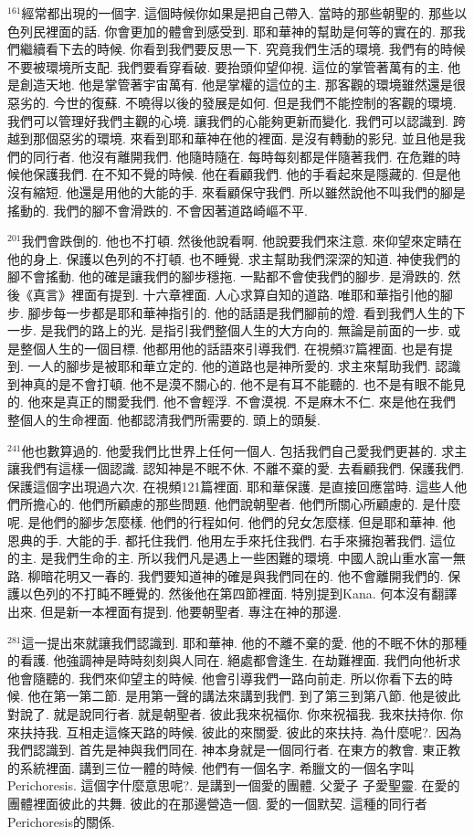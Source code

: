 \documentclass{book}
\begin{document}
$^{161}$經常都出現的一個字.
這個時候你如果是把自己帶入.
當時的那些朝聖的.
那些以色列民裡面的話.
你會更加的體會到感受到.
耶和華神的幫助是何等的實在的.
那我們繼續看下去的時候.
你看到我們要反思一下.
究竟我們生活的環境.
我們有的時候不要被環境所支配.
我們要看穿看破.
要抬頭仰望仰視.
這位的掌管著萬有的主.
他是創造天地.
他是掌管著宇宙萬有.
他是掌權的這位的主.
那客觀的環境雖然還是很惡劣的.
今世的復蘇.
不曉得以後的發展是如何.
但是我們不能控制的客觀的環境.
我們可以管理好我們主觀的心境.
讓我們的心能夠更新而變化.
我們可以認識到.
跨越到那個惡劣的環境.
來看到耶和華神在他的裡面.
是沒有轉動的影兒.
並且他是我們的同行者.
他沒有離開我們.
他隨時隨在.
每時每刻都是伴隨著我們.
在危難的時候他保護我們.
在不知不覺的時候.
他在看顧我們.
他的手看起來是隱藏的.
但是他沒有縮短.
他還是用他的大能的手.
來看顧保守我們.
所以雖然說他不叫我們的腳是搖動的.
我們的腳不會滑跌的.
不會因著道路崎嶇不平.

$^{201}$我們會跌倒的.
他也不打頓.
然後他說看啊.
他說要我們來注意.
來仰望來定睛在他的身上.
保護以色列的不打頓.
也不睡覺.
求主幫助我們深深的知道.
神使我們的腳不會搖動.
他的確是讓我們的腳步穩拖.
一點都不會使我們的腳步.
是滑跌的.
然後《真言》裡面有提到.
十六章裡面.
人心求算自知的道路.
唯耶和華指引他的腳步.
腳步每一步都是耶和華神指引的.
他的話語是我們腳前的燈.
看到我們人生的下一步.
是我們的路上的光.
是指引我們整個人生的大方向的.
無論是前面的一步.
或是整個人生的一個目標.
他都用他的話語來引導我們.
在視頻37篇裡面.
也是有提到.
一人的腳步是被耶和華立定的.
他的道路也是神所愛的.
求主來幫助我們.
認識到神真的是不會打頓.
他不是漠不關心的.
他不是有耳不能聽的.
也不是有眼不能見的.
他來是真正的關愛我們.
他不會輕浮.
不會漠視.
不是麻木不仁.
來是他在我們整個人的生命裡面.
他都認清我們所需要的.
頭上的頭髮.

$^{241}$他也數算過的.
他愛我們比世界上任何一個人.
包括我們自己愛我們更甚的.
求主讓我們有這樣一個認識.
認知神是不眠不休.
不離不棄的愛.
去看顧我們.
保護我們.
保護這個字出現過六次.
在視頻121篇裡面.
耶和華保護.
是直接回應當時.
這些人他們所擔心的.
他們所顧慮的那些問題.
他們說朝聖者.
他們所關心所顧慮的.
是什麼呢.
是他們的腳步怎麼樣.
他們的行程如何.
他們的兒女怎麼樣.
但是耶和華神.
他恩典的手.
大能的手.
都托住我們.
他用左手來托住我們.
右手來擁抱著我們.
這位的主.
是我們生命的主.
所以我們凡是遇上一些困難的環境.
中國人說山重水富一無路.
柳暗花明又一春的.
我們要知道神的確是與我們同在的.
他不會離開我們的.
保護以色列的不打盹不睡覺的.
然後他在第四節裡面.
特別提到Kana.
何本沒有翻譯出來.
但是新一本裡面有提到.
他要朝聖者.
專注在神的那邊.

$^{281}$這一提出來就讓我們認識到.
耶和華神.
他的不離不棄的愛.
他的不眠不休的那種的看護.
他強調神是時時刻刻與人同在.
絕處都會逢生.
在劫難裡面.
我們向他祈求他會隨聽的.
我們來仰望主的時候.
他會引導我們一路向前走.
所以你看下去的時候.
他在第一第二節.
是用第一聲的講法來講到我們.
到了第三到第八節.
他是彼此對說了.
就是說同行者.
就是朝聖者.
彼此我來祝福你.
你來祝福我.
我來扶持你.
你來扶持我.
互相走這條天路的時候.
彼此的來關愛.
彼此的來扶持.
為什麼呢?.
因為我們認識到.
首先是神與我們同在.
神本身就是一個同行者.
在東方的教會.
東正教的系統裡面.
講到三位一體的時候.
他們有一個名字.
希臘文的一個名字叫Perichoresis.
這個字什麼意思呢?.
是講到一個愛的團體.
父愛子 子愛聖靈.
在愛的團體裡面彼此的共舞.
彼此的在那邊營造一個.
愛的一個默契.
這種的同行者Perichoresis的關係.
\end{document}
